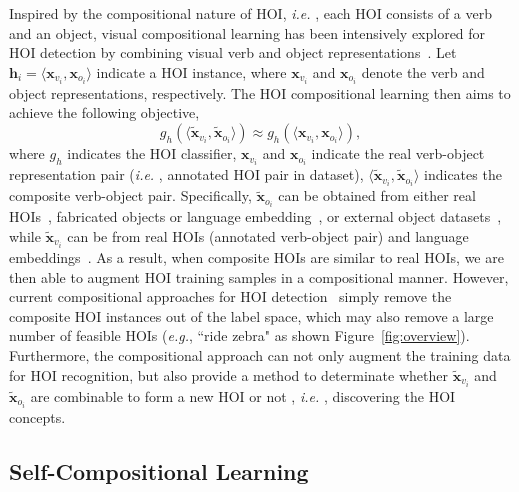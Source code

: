 \documentclass[runningheads]{llncs}
\newcommand{\ie}{\textit{i.e. }}
\newcommand{\eg}{\textit{e.g.}}
\begin{document}
Inspired by the compositional nature of HOI, \ie, each HOI consists of a verb and an object, visual compositional learning has been intensively explored for HOI detection by combining visual verb and object representations~\cite{kato2018compositional,hou2020visual,hou2021fcl,hou2021atl}. Let $\mathbf{h}_i = \langle \mathbf{x}_{v_i}, \mathbf{x}_{o_i} \rangle$ indicate a HOI instance, where $\mathbf{x}_{v_i}$ and $\mathbf{x}_{o_i}$ denote the verb and object representations, respectively. The HOI compositional learning then aims to achieve the following objective,
\begin{equation}
   g_{h}(\langle\widetilde{\mathbf{x}}_{v_i},\widetilde{\mathbf{x}}_{o_i}\rangle) \approx  g_{h}(\langle\mathbf{x}_{v_i},\mathbf{x}_{o_i}\rangle),
\end{equation}
where $g_{h}$ indicates the HOI classifier, $\mathbf{x}_{v_i}$ and $\mathbf{x}_{o_i}$ indicate the real verb-object representation pair (\ie, annotated HOI pair in dataset),  $\langle \widetilde{\mathbf{x}}_{v_i}, \widetilde{\mathbf{x}}_{o_i}\rangle$ indicates the composite verb-object pair. Specifically, $\widetilde{\mathbf{x}}_{o_i}$ can be obtained from either real HOIs~\cite{hou2020visual}, fabricated objects or language embedding~\cite{hou2021fcl,bansal2020detecting,preye2019detecting}, or external object datasets~\cite{hou2021atl}, while $\widetilde{\mathbf{x}}_{v_i}$ can be from real HOIs (annotated verb-object pair) and language embeddings~\cite{kato2018compositional,preye2019detecting}. As a result, when composite HOIs are similar to real HOIs, we are then able to augment HOI training samples in a compositional manner. However, current compositional approaches for HOI detection~\cite{hou2020visual,hou2021atl} simply remove the composite HOI instances out of the label space, which may also remove a large number of feasible HOIs (\eg, ``ride zebra" as shown Figure~\ref{fig:overview}). Furthermore, the compositional approach can not only augment the training data for HOI recognition, but also provide a method to determinate whether $\widetilde{\mathbf{x}}_{v_i}$ and $\widetilde{\mathbf{x}}_{o_i}$ are combinable to form a new HOI or not \cite{hou2021atl}, \ie, discovering the HOI concepts.


\subsection{Self-Compositional Learning}
\end{document}
